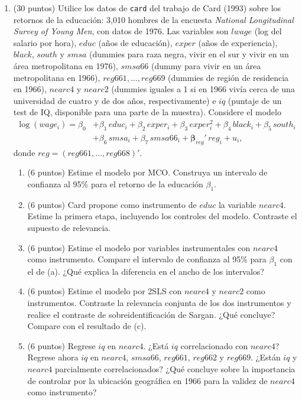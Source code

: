 \documentclass[letterpaper,11pt]{article}
\begin{document}
\begin{enumerate}
\item (30 puntos) Utilice los datos de \texttt{card} del trabajo de Card (1993) sobre los
    retornos de la educación: 3,010 hombres de la encuesta \textit{National Longitudinal
    Survey of Young Men}, con datos de 1976. Las variables son $lwage$ (log del salario por
    hora), $educ$ (años de educación), $exper$ (años de experiencia), $black$, $south$ y $smsa$
    (dummies para raza negra, vivir en el sur y vivir en un área metropolitana en 1976),
    $smsa66$ (dummy para vivir en un área metropolitana en 1966), $reg661,\dots,reg669$
    (dummies de región de residencia en 1966), $nearc4$ y $nearc2$ (dummies iguales a 1 si en
    1966 vivía cerca de una universidad de cuatro y de dos años, respectivamente) e $iq$
    (puntaje de un test de IQ, disponible para una parte de la muestra). Considere el modelo
    \begin{align*}
    \log(wage_i)=\beta_0&+\beta_1\, educ_i+\beta_2\, exper_i+\beta_3\, exper_i^2+\beta_4\, black_i
    +\beta_5\, south_i\\&+\beta_6\, smsa_i+\beta_7\, smsa66_i+\boldsymbol\beta_{reg}'\, reg_i+u_i,
    \end{align*}
    donde $reg=(reg661,\dots,reg668)'$.
    \begin{enumerate}
        \item (6 puntos) Estime el modelo por MCO. Construya un intervalo de confianza al 95\%
            para el retorno de la educación $\beta_1$.
        \item (6 puntos) Card propone como instrumento de $educ$ la variable $nearc4$. Estime la
            primera etapa, incluyendo los controles del modelo. Contraste el supuesto de
            relevancia.
        \item (6 puntos) Estime el modelo por variables instrumentales con $nearc4$ como
            instrumento. Compare el intervalo de confianza al 95\% para $\beta_1$ con el de (a).
            ¿Qué explica la diferencia en el ancho de los intervalos?
        \item (6 puntos) Estime el modelo por 2SLS con $nearc4$ y $nearc2$ como instrumentos.
            Contraste la relevancia conjunta de los dos instrumentos y realice el contraste de
            sobreidentificación de Sargan. ¿Qué concluye? Compare con el resultado de (c).
        \item (6 puntos) Regrese $iq$ en $nearc4$. ¿Está $iq$ correlacionado con $nearc4$?
            Regrese ahora $iq$ en $nearc4$, $smsa66$, $reg661$, $reg662$ y $reg669$. ¿Están $iq$
            y $nearc4$ parcialmente correlacionados? ¿Qué concluye sobre la importancia de
            controlar por la ubicación geográfica en 1966 para la validez de $nearc4$ como
            instrumento?
    \end{enumerate}


\end{enumerate}
\end{document}
